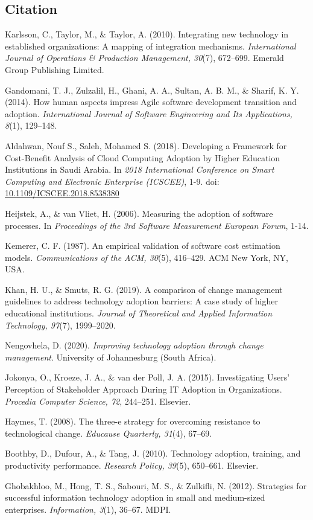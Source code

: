\documentclass{article}
\begin{document}
\subsection{Citation}
\begin{enumerate}
     Karlsson, C., Taylor, M., \& Taylor, A. (2010). Integrating new technology in established organizations: A mapping of integration mechanisms. \textit{International Journal of Operations \& Production Management, 30}(7), 672--699. Emerald Group Publishing Limited.
  
     Gandomani, T. J., Zulzalil, H., Ghani, A. A., Sultan, A. B. M., \& Sharif, K. Y. (2014). How human aspects impress Agile software development transition and adoption. \textit{International Journal of Software Engineering and Its Applications, 8}(1), 129--148.

    Aldahwan, Nouf S., Saleh, Mohamed S. (2018). Developing a Framework for Cost-Benefit Analysis of Cloud Computing Adoption by Higher Education Institutions in Saudi Arabia. In \textit{2018 International Conference on Smart Computing and Electronic Enterprise (ICSCEE)}, 1-9. doi: \url{10.1109/ICSCEE.2018.8538380}

     Heijstek, A., \& van Vliet, H. (2006). Measuring the adoption of software processes. In \textit{Proceedings of the 3rd Software Measurement European Forum}, 1-14. 

     Kemerer, C. F. (1987). An empirical validation of software cost estimation models. \textit{Communications of the ACM, 30}(5), 416--429. ACM New York, NY, USA.

     Khan, H. U., \& Smuts, R. G. (2019). A comparison of change management guidelines to address technology adoption barriers: A case study of higher educational institutions. \textit{Journal of Theoretical and Applied Information Technology, 97}(7), 1999--2020.

     Nengovhela, D. (2020). \textit{Improving technology adoption through change management}. University of Johannesburg (South Africa).

     Jokonya, O., Kroeze, J. A., \& van der Poll, J. A. (2015). Investigating Users' Perception of Stakeholder Approach During IT Adoption in Organizations. \textit{Procedia Computer Science, 72}, 244--251. Elsevier.

     Haymes, T. (2008). The three-e strategy for overcoming resistance to technological change. \textit{Educause Quarterly, 31}(4), 67--69.

     Boothby, D., Dufour, A., \& Tang, J. (2010). Technology adoption, training, and productivity performance. \textit{Research Policy, 39}(5), 650--661. Elsevier.

     Ghobakhloo, M., Hong, T. S., Sabouri, M. S., \& Zulkifli, N. (2012). Strategies for successful information technology adoption in small and medium-sized enterprises. \textit{Information, 3}(1), 36--67. MDPI.
    
\end{enumerate}
\end{document}
